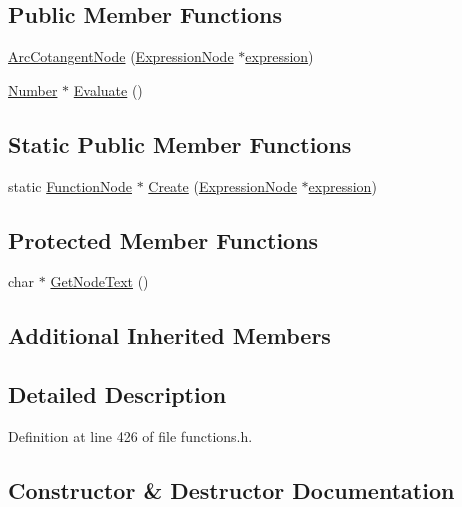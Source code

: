 \subsection*{Public Member Functions}
\begin{DoxyCompactItemize}
\item 
\hyperlink{classArcCotangentNode_aa67c2c4d48741e686b660c010c49bd41}{Arc\+Cotangent\+Node} (\hyperlink{classExpressionNode}{Expression\+Node} $\ast$\hyperlink{classFunctionNode_ad7577b179a1937aaf8a0058bb5b546dc}{expression})
\item 
\hyperlink{structNumber}{Number} $\ast$ \hyperlink{classArcCotangentNode_ace4c556eff07fb8352f8f341fa20702a}{Evaluate} ()
\end{DoxyCompactItemize}
\subsection*{Static Public Member Functions}
\begin{DoxyCompactItemize}
\item 
static \hyperlink{classFunctionNode}{Function\+Node} $\ast$ \hyperlink{classArcCotangentNode_a696c949ce9855f55d8e593622ebc0400}{Create} (\hyperlink{classExpressionNode}{Expression\+Node} $\ast$\hyperlink{classFunctionNode_ad7577b179a1937aaf8a0058bb5b546dc}{expression})
\end{DoxyCompactItemize}
\subsection*{Protected Member Functions}
\begin{DoxyCompactItemize}
\item 
char $\ast$ \hyperlink{classArcCotangentNode_aab2b4d2d357a47e4174e3daa82773ab1}{Get\+Node\+Text} ()
\end{DoxyCompactItemize}
\subsection*{Additional Inherited Members}


\subsection{Detailed Description}


Definition at line 426 of file functions.\+h.



\subsection{Constructor \& Destructor Documentation}
